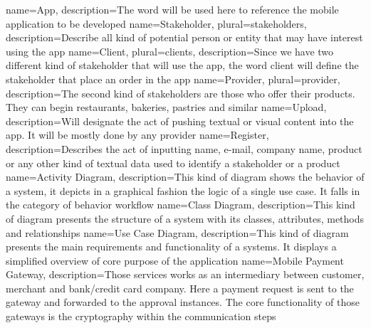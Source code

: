 
\makeglossaries


 {
    name={App},
    description={The word will be used here to reference the mobile application to be developed}
}
 {
    name={Stakeholder},
    plural={stakeholders},
    description={Describe all kind of potential person or entity that may have interest using the app}
}
 {
    name={Client},
    plural={clients},
    description={Since we have two different kind of stakeholder that will use the app, the word
                 client will define the stakeholder that place an order in the app}
}
 {
    name={Provider},
    plural={provider},
    description={The second kind of stakeholders are those who offer their products. They can begin
                restaurants, bakeries, pastries and similar}
}
 {
    name={Upload},
    description={Will designate the act of pushing textual or visual content into the app. It will
                be mostly done by any provider}
}
 {
    name={Register},
    description={Describes the act of inputting name, e-mail, company name, product or any other kind of
    textual data used to identify a stakeholder or a product}
}
 {
    name={Activity Diagram},
    description={This kind of diagram shows the behavior of a system, it depicts in a graphical fashion 
    the logic of a single use case. It falls in the category of behavior workflow \cite{refinbook:Baresi2009}}
}
 {
    name={Class Diagram},
    description={This kind of diagram presents the structure of a system with its classes, attributes,
    methods and relationships\cite{refonline:IBMCD}}
}
 {
    name={Use Case Diagram},
    description={This kind of diagram presents the main requirements and functionality of a systems. It displays
    a simplified overview of core purpose of the application \cite{refart:YWRUS}}
}
 {
    name={Mobile Payment Gateway},
    description={Those services works as an intermediary between customer, merchant and bank/credit card company. 
    Here a payment request is sent to the gateway and forwarded to the approval instances. The core functionality 
    of those gateways is the cryptography within the communication steps\cite{refonline:VPGI}}
}

